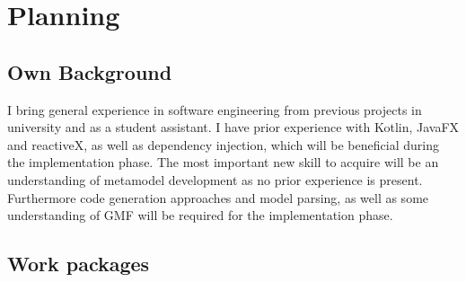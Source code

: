 \documentclass[10pt,a4paper,oneside]{scrartcl}
\newcommand\hint[2]{
\ifthenelse{\boolean{showhints}}{
\begin{center}
\colorbox{black!10}{
\begin{minipage}{.963\textwidth}
#2\hfill\textbf{#1}
\end{minipage}
}\end{center}}{}
}
\begin{document}
\section{Planning}
\label{sec:planning}

\subsection{Own Background}
\label{sub:background}


I bring general experience in software engineering from previous projects in university and as a student assistant. I have prior experience with Kotlin, JavaFX and reactiveX, as well as dependency injection, which will be beneficial during the implementation phase. The most important new skill to acquire will be an understanding of metamodel development as no prior experience is present. Furthermore code generation approaches and model parsing, as well as some understanding of GMF will be required for the implementation phase.



\subsection{Work packages}
\label{sub:wp}

\end{document}
